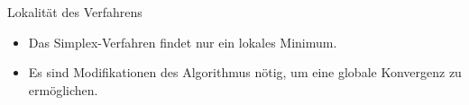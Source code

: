 \documentclass[accentcolor = tud11b, colorbacktitle, landscape, german, presentation, tudmathserif]{tudbeamer}
\begin{document}
%						
		
			\begin{frame}{Lokalität des Verfahrens}
				\begin{itemize}
					\item Das Simplex-Verfahren findet nur ein lokales Minimum.
					\item Es sind Modifikationen des Algorithmus nötig, um eine globale Konvergenz zu ermöglichen.
				\end{itemize}
			\end{frame}
		
\end{document}

